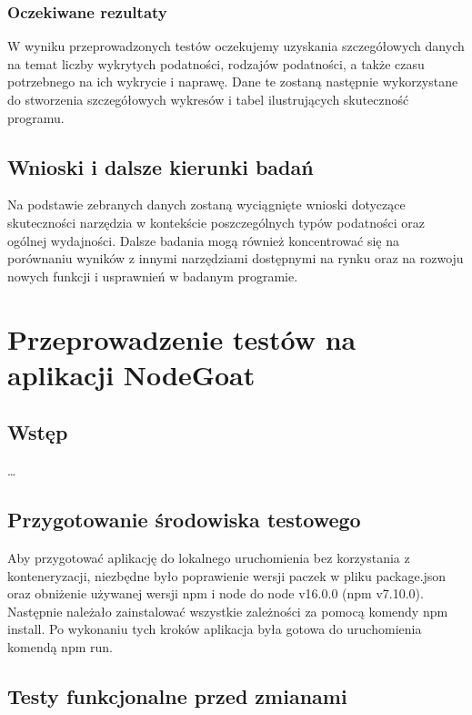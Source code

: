 \subsection{Oczekiwane rezultaty}
W wyniku przeprowadzonych testów oczekujemy uzyskania szczegółowych danych na temat liczby wykrytych podatności, rodzajów podatności, a także czasu potrzebnego na ich wykrycie i naprawę. Dane te zostaną następnie wykorzystane do stworzenia szczegółowych wykresów i tabel ilustrujących skuteczność programu.

\section{Wnioski i dalsze kierunki badań}
Na podstawie zebranych danych zostaną wyciągnięte wnioski dotyczące skuteczności narzędzia w kontekście poszczególnych typów podatności oraz ogólnej wydajności. Dalsze badania mogą również koncentrować się na porównaniu wyników z innymi narzędziami dostępnymi na rynku oraz na rozwoju nowych funkcji i usprawnień w badanym programie.

\chapter{Przeprowadzenie testów na aplikacji NodeGoat}

\section{Wstęp}
\label{sec:wstep}
\dots

\section{Przygotowanie środowiska testowego}
\label{sec:przygotowanie_srodowiska_testowego}

Aby przygotować aplikację do lokalnego uruchomienia bez korzystania z konteneryzacji, niezbędne było poprawienie wersji paczek w pliku package.json oraz obniżenie używanej wersji npm i node do node v16.0.0 (npm v7.10.0). Następnie należało zainstalować wszystkie zależności za pomocą komendy npm install. Po wykonaniu tych kroków aplikacja była gotowa do uruchomienia komendą npm run.

\section{Testy funkcjonalne przed zmianami}
\label{sec:testy_funkcjonalne_przed_zmianami}

